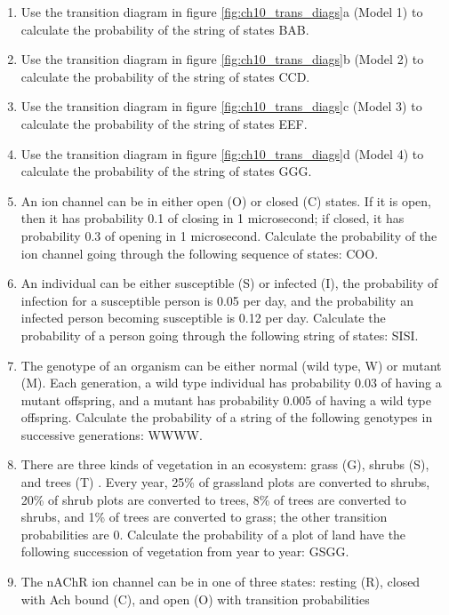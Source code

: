 \documentclass[
  letterpaper,
  DIV=11,
  numbers=noendperiod]{scrreprt}
\begin{document}
\begin{enumerate}
\def\labelenumi{\arabic{enumi}.}
\item
  Use the transition diagram in figure \ref{fig:ch10_trans_diags}a
  (Model 1) to calculate the probability of the string of states BAB.
\item
  Use the transition diagram in figure \ref{fig:ch10_trans_diags}b
  (Model 2) to calculate the probability of the string of states CCD.
\item
  Use the transition diagram in figure \ref{fig:ch10_trans_diags}c
  (Model 3) to calculate the probability of the string of states EEF.
\item
  Use the transition diagram in figure \ref{fig:ch10_trans_diags}d
  (Model 4) to calculate the probability of the string of states GGG.
\item
  An ion channel can be in either open (O) or closed (C) states. If it
  is open, then it has probability 0.1 of closing in 1 microsecond; if
  closed, it has probability 0.3 of opening in 1 microsecond. Calculate
  the probability of the ion channel going through the following
  sequence of states: COO.
\item
  An individual can be either susceptible (S) or infected (I), the
  probability of infection for a susceptible person is 0.05 per day, and
  the probability an infected person becoming susceptible is 0.12 per
  day. Calculate the probability of a person going through the following
  string of states: SISI.
\item
  The genotype of an organism can be either normal (wild type, W) or
  mutant (M). Each generation, a wild type individual has probability
  0.03 of having a mutant offspring, and a mutant has probability 0.005
  of having a wild type offspring. Calculate the probability of a string
  of the following genotypes in successive generations: WWWW.
\item
  There are three kinds of vegetation in an ecosystem: grass (G), shrubs
  (S), and trees (T) \cite{bodine_mathematics_2014}. Every year, 25\% of
  grassland plots are converted to shrubs, 20\% of shrub plots are
  converted to trees, 8\% of trees are converted to shrubs, and 1\% of
  trees are converted to grass; the other transition probabilities are
  0. Calculate the probability of a plot of land have the following
  succession of vegetation from year to year: GSGG.
\item
  The nAChR ion channel can be in one of three states: resting (R),
  closed with Ach bound (C), and open (O) with transition probabilities

\end{enumerate}
\end{document}
